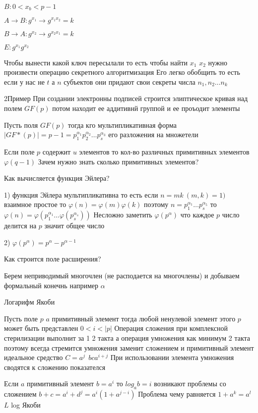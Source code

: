 $B: 0 < x_b < p-1$

$A \to B: g^{x_1} \to g^{x_1 x_2} = k$

$B \to A: g^{x_2} \to g^{x_2 x_1} = k$

$E:g^{x_1}g^{x_2}$

Чтобы вынести какой ключ пересылали то есть чтобы найти $x_1$ $x_2$ нужно
произвести операцию секретного алгоритмизация Его легко обобщить то есть
если у нас не $t$ а $n$ субъектов они придают свои секреты числа
$n_1, n_2 \ldots n_k$


2Пример При создании электронны подписей строится элиптическое кривая над полем
$GF(p)$ потом находит ее аддитивнй группой и ее проъодит элементы

Пусть поля $GF(p)$ тогда кго мультипликативная форма $|GF*(p)| = p-1 =
p_1^{\alpha_1}p_2^{\alpha_2} \ldots p_s^{\alpha_3}$ его разложения на
множетели

\begin{theorem}
  Если поле $p$ содержит $u$ элементов то кол-во различных примитивных
  элементов $\varphi(q-1)$ Зачем нужно знать сколько примитивных элементов?
\end{theorem}

Как вычисляется функция Эйлера?

1) функция Эйлера мультипликативна то есть если $n=mk ~ (m,k) = 1)$
взаимное простое то $\varphi(n) = \varphi(m) \varphi(k)$ поэтому
$n = p_1^{\alpha_1} \ldots p_s^{\alpha_5}$ то $\varphi(n) = \varphi(p_1^{
\alpha_1} \ldots \varphi(p_s^{\alpha_s}))$ Несложно заметить
$\varphi(p^{\alpha})$ что каждое $p$ число делится на $p$ значит общее число

2) $\varphi(p^{\alpha}) = p^{\alpha} - p^{\alpha-1}$

Как строится поле расширения?

Берем неприводимый многочлен (не расподается на многочлены) и добываем
формальный конечнь например $\alpha$

Логарифм Якоби

Пусть поле $p$ $a$ примитивный элемент тогда любой ненулевой элемент этого $p$
может быть представлен $0 < i < |p|$ Операция сложения при комплексной
стерилизации выполнит за 1 2 такта а операция умножения как минимум 2 такта
поэтому всегда стремится умножения заменит сложением и примитивный элемент
идеальное средство $C = a^j ~~ bc a^{i+j}$ При использовании элемента
умножения сводятся к сложению показателся

Если $a$ примитивный элемент $b = a^i$ то $log_a b = i$ возникают проблемы со
сложением $b + c = a^i + d^j = a^i(1+ a^{j-i})$ Проблема чему равняется
$1+a^k = a^l$ $L$ log Якоби

